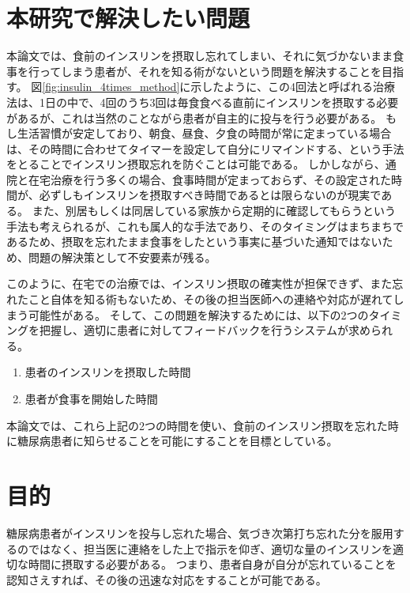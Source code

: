 \section{本研究で解決したい問題}
\label{section:problem}

本論文では、食前のインスリンを摂取し忘れてしまい、それに気づかないまま食事を行ってしまう患者が、それを知る術がないという問題を解決することを目指す。
図\ref{fig:insulin_4times_method}に示したように、この4回法と呼ばれる治療法は、1日の中で、4回のうち3回は毎食食べる直前にインスリンを摂取する必要があるが、これは当然のことながら患者が自主的に投与を行う必要がある。
もし生活習慣が安定しており、朝食、昼食、夕食の時間が常に定まっている場合は、その時間に合わせてタイマーを設定して自分にリマインドする、という手法をとることでインスリン摂取忘れを防ぐことは可能である。
しかしながら、通院と在宅治療を行う多くの場合、食事時間が定まっておらず、その設定された時間が、必ずしもインスリンを摂取すべき時間であるとは限らないのが現実である。
また、別居もしくは同居している家族から定期的に確認してもらうという手法も考えられるが、これも属人的な手法であり、そのタイミングはまちまちであるため、摂取を忘れたまま食事をしたという事実に基づいた通知ではないため、問題の解決策として不安要素が残る。

このように、在宅での治療では、インスリン摂取の確実性が担保できず、また忘れたこと自体を知る術もないため、その後の担当医師への連絡や対応が遅れてしまう可能性がある。
そして、この問題を解決するためには、以下の2つのタイミングを把握し、適切に患者に対してフィードバックを行うシステムが求められる。

\begin{enumerate}
  \item 患者のインスリンを摂取した時間
  \item 患者が食事を開始した時間
\end{enumerate}

本論文では、これら上記の2つの時間を使い、食前のインスリン摂取を忘れた時に糖尿病患者に知らせることを可能にすることを目標としている。

\section{目的}
\label{section:purpose}

糖尿病患者がインスリンを投与し忘れた場合、気づき次第打ち忘れた分を服用するのではなく、担当医に連絡をした上で指示を仰ぎ、適切な量のインスリンを適切な時間に摂取する必要がある。
つまり、患者自身が自分が忘れていることを認知さえすれば、その後の迅速な対応をすることが可能である。

